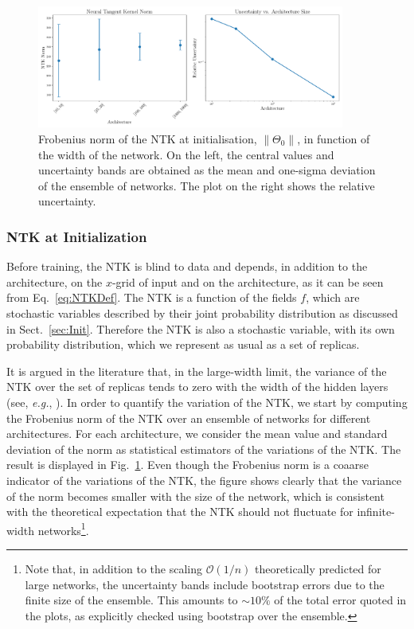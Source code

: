 \begin{figure}[t!]
  \centering
  \includegraphics[width=0.90\textwidth]{figs/section_3/ntk_initialization_with_uncertainty.pdf}
  \caption{Frobenius norm of the NTK at initialisation, $\lVert \Theta_0
  \rVert$, in function of the width of the network. On the left, the central
  values and uncertainty bands are obtained as the mean and one-sigma deviation
  of the ensemble of networks. The plot on the right shows the relative
  uncertainty.}
  \label{fig:NTKInit}
\end{figure}

\subsubsection{NTK at Initialization}
\label{sec:NTKAtInit}

Before training, the NTK is blind to data and depends, in addition to the
architecture, on the $x$-grid of input and on the architecture, as it can be
seen from Eq.~\eqref{eq:NTKDef}. The NTK is a function of the fields $f$, which
are stochastic variables described by their joint probability distribution as
discussed in Sect.~\ref{sec:Init}. Therefore the NTK is also a stochastic
variable, with its own probability distribution, which we represent as usual as
a set of replicas. 

It is argued in the literature that, in the large-width limit, the variance of
the NTK over the set of replicas tends to zero with the width of the hidden
layers (see, \textit{e.g.}, \cite{Roberts:2021fes}). In order to quantify the
variation of the NTK, we start by computing the Frobenius norm of the NTK over
an ensemble of networks for different architectures. For each architecture, we
consider the mean value and standard deviation of the norm as statistical
estimators of the variations of the NTK. The result is displayed in
Fig.~\ref{fig:NTKInit}. Even though the Frobenius norm is a coaarse indicator of
the variations of the NTK, the figure shows clearly that the variance of the
norm becomes smaller with the size of the network, which is consistent with the
theoretical expectation that the NTK should not fluctuate for infinite-width
networks\footnote{Note that, in addition to the scaling $\mathcal{O}(1/n)$
theoretically predicted for large networks, the uncertainty bands include
bootstrap errors due to the finite size of the ensemble. This amounts to $\sim
10\%$ of the total error quoted in the plots, as explicitly checked using
bootstrap over the ensemble.}.

